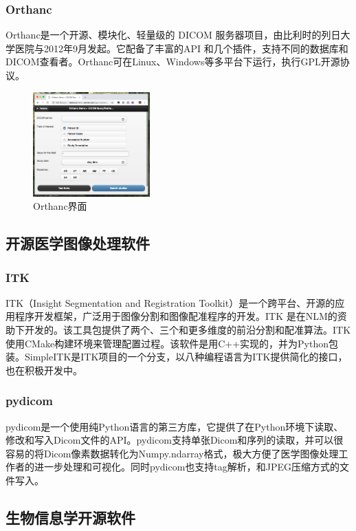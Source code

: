 \documentclass[UTF8]{ctexart}
\begin{document}
\subsubsection{Orthanc}
Orthanc是一个开源、模块化、轻量级的 DICOM 服务器项目，由比利时的列日大学医院与2012年9月发起\cite{topPACS}。它配备了丰富的API 和几个插件，支持不同的数据库和DICOM查看者。Orthanc可在Linux、Windows等多平台下运行，执行GPL开源协议。

\begin{figure}[H]
    \centering
    \includegraphics[width=0.4\textwidth]{orthanc.png}
    \caption{Orthanc界面}
    \label{fig:Orthanc}
\end{figure}


\subsection{开源医学图像处理软件}
\subsubsection{ITK}
ITK（Insight Segmentation and Registration Toolkit）是一个跨平台、开源的应用程序开发框架，广泛用于图像分割和图像配准程序的开发\cite{enwiki:1013660206}。ITK 是在NLM的资助下开发的。该工具包提供了两个、三个和更多维度的前沿分割和配准算法。ITK使用CMake构建环境来管理配置过程。该软件是用C++实现的，并为Python包装。SimpleITK是ITK项目的一个分支，以八种编程语言为ITK提供简化的接口，也在积极开发中。
\subsubsection{pydicom}
pydicom是一个使用纯Python语言的第三方库，它提供了在Python环境下读取、修改和写入Dicom文件的API。pydicom支持单张Dicom和序列的读取，并可以很容易的将Dicom像素数据转化为Numpy.ndarray格式，极大方便了医学图像处理工作者的进一步处理和可视化。同时pydicom也支持tag解析，和JPEG压缩方式的文件写入。

\subsection{生物信息学开源软件}
\end{document}
